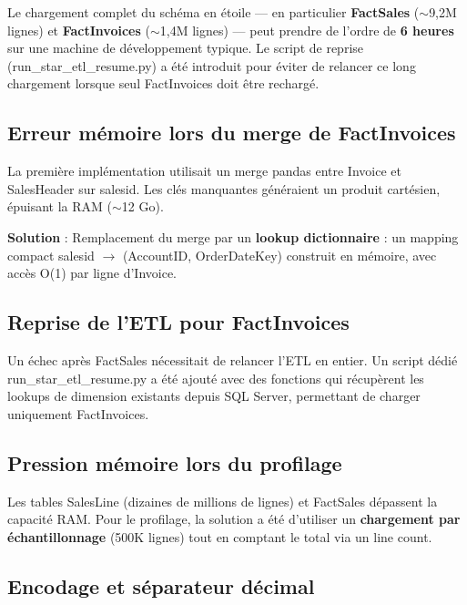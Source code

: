 \documentclass[11pt,a4paper]{article}
\renewcommand{\texttt}[1]{{\ttfamily\small\colorbox{codebg}{\textcolor{darktext}{#1}}}}
\begin{document}
Le chargement complet du schéma en étoile --- en particulier \textbf{FactSales} ($\sim$9,2M lignes) et \textbf{FactInvoices} ($\sim$1,4M lignes) --- peut prendre de l'ordre de \textbf{6 heures} sur une machine de développement typique. Le script de reprise (\texttt{run\_star\_etl\_resume.py}) a été introduit pour éviter de relancer ce long chargement lorsque seul FactInvoices doit être rechargé.

\subsection{Erreur mémoire lors du merge de FactInvoices}

\begin{warnbox}[ArrayMemoryError]
La première implémentation utilisait un \texttt{merge} pandas entre Invoice et SalesHeader sur \texttt{salesid}. Les clés manquantes généraient un produit cartésien, épuisant la RAM ($\sim$12 Go).
\end{warnbox}

\textbf{Solution} : Remplacement du merge par un \textbf{lookup dictionnaire} : un mapping compact \texttt{salesid} $\to$ (AccountID, OrderDateKey) construit en mémoire, avec accès O(1) par ligne d'Invoice.

\subsection{Reprise de l'ETL pour FactInvoices}

Un échec après FactSales nécessitait de relancer l'ETL en entier. Un script dédié \texttt{run\_star\_etl\_resume.py} a été ajouté avec des fonctions qui récupèrent les lookups de dimension existants depuis SQL Server, permettant de charger uniquement FactInvoices.

\subsection{Pression mémoire lors du profilage}

Les tables SalesLine (dizaines de millions de lignes) et FactSales dépassent la capacité RAM. Pour le profilage, la solution a été d'utiliser un \textbf{chargement par échantillonnage} (500K lignes) tout en comptant le total via un line count.

\subsection{Encodage et séparateur décimal}
\end{document}
